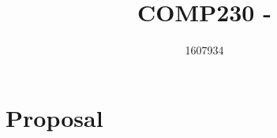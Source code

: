 \documentclass{scrartcl}
\title{COMP230 - }
\author{1607934}
\begin{document}
\maketitle

\section{Proposal}





\end{document}
